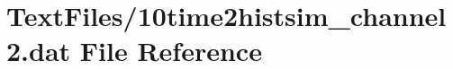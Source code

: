\hypertarget{10time2histsim__channel2_8dat}{}\section{Text\+Files/10time2histsim\+\_\+channel2.dat File Reference}
\label{10time2histsim__channel2_8dat}
